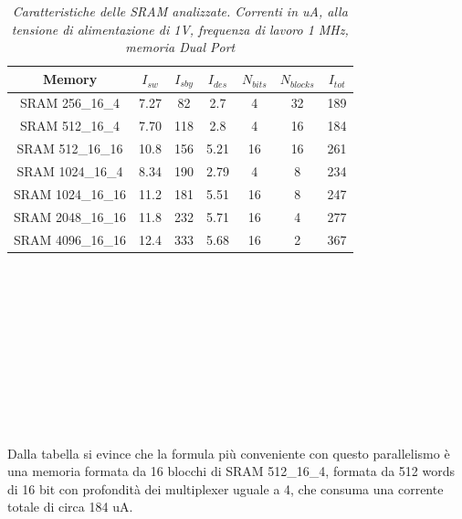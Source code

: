 \begin{table}[!h]\footnotesize
	\centering
	\begin{tabular}{|cccccc|c|}
		\hline
		\textbf{Memory} & \textbf{$I_{sw}$}& \textbf{$I_{sby}$} & \textbf{$I_{des}$} & \textbf{$N_{bits}$} & \textbf{$N_{blocks}$} &
		\textbf{$I_{tot}$}
		\\
		\hline
		SRAM 256\_16\_4 & 7.27 & 82 &2.7 & 4 & 32 & 189\\
		SRAM 512\_16\_4 & 7.70 & 118 & 2.8 &  4 & 16 & 184\\
		SRAM 512\_16\_16 & 10.8 & 156 & 5.21 & 16 & 16 & 261\\
		SRAM 1024\_16\_4 & 8.34 & 190 & 2.79 & 4 & 8 & 234\\
		SRAM 1024\_16\_16 & 11.2 & 181 & 5.51 & 16 & 8 & 247\\
		SRAM 2048\_16\_16 & 11.8 & 232 & 5.71 & 16 & 4 & 277\\
		SRAM 4096\_16\_16 & 12.4 & 333 & 5.68 & 16  & 2 & 367\\
		\hline
	\end{tabular}
	\caption{\textit{Caratteristiche delle SRAM analizzate. Correnti in uA, alla tensione di alimentazione di 1V, frequenza di lavoro 1 MHz, memoria Dual Port}}
	\label{Tab5_25}
\end{table}
\\
\\
\\
\\
\\
\\
\\
\\
\\
\\
Dalla tabella si evince che la formula più conveniente con questo parallelismo è una memoria formata da 16 blocchi di  SRAM 512\_16\_4, formata da 512  words  di 16 bit con profondità dei multiplexer uguale a 4, che consuma una corrente totale di circa 184 uA.
